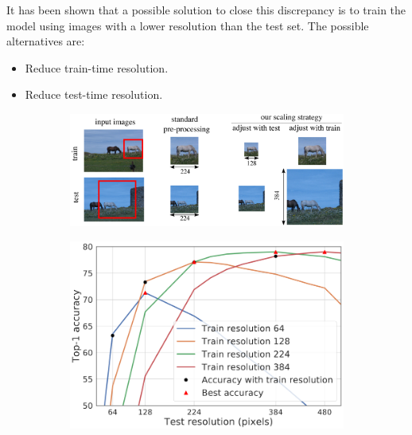 \begin{description}
        It has been shown that a possible solution to close this discrepancy is to train the model using images with a lower resolution than the test set. The possible alternatives are:
        \begin{itemize}
            \item Reduce train-time resolution.
            \item Reduce test-time resolution.
        \end{itemize}
        \begin{figure}[H]
            \centering
            \begin{subfigure}{0.6\linewidth}
                \centering
                \includegraphics[width=0.9\linewidth]{./img/fixres2.png}
            \end{subfigure}
            \begin{subfigure}{0.38\linewidth}
                \centering
                \includegraphics[width=0.9\linewidth]{./img/fixres3.png}
            \end{subfigure}
        \end{figure}
\end{description}